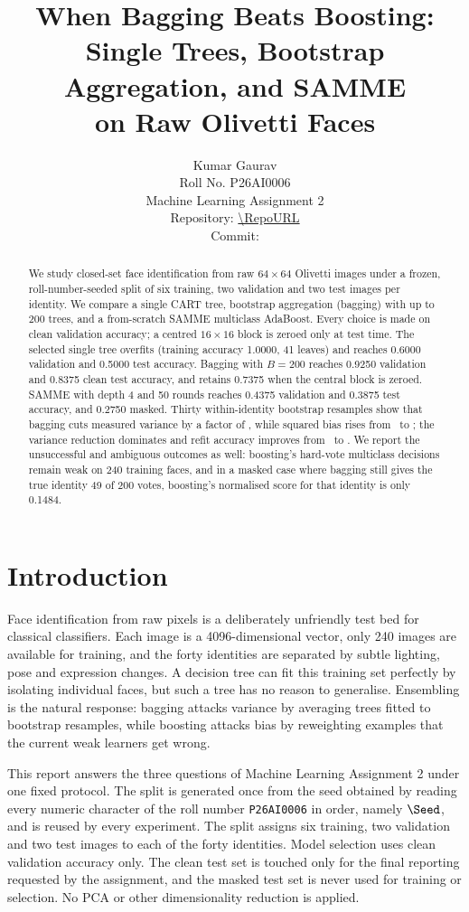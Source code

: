 \documentclass[10pt,twocolumn,letterpaper]{article}
\title{When Bagging Beats Boosting:\\
Single Trees, Bootstrap Aggregation, and SAMME\\ on Raw Olivetti Faces}
\author{Kumar Gaurav\\
Roll No. P26AI0006\\
Machine Learning Assignment 2\\
\small Repository: \url{\RepoURL}\\
\small Commit: \texttt{\CommitHash}}
\begin{document}
\maketitle

\begin{abstract}
We study closed-set face identification from raw $64\times64$ Olivetti images
under a frozen, roll-number-seeded split of six training, two validation and two
test images per identity.  We compare a single CART tree, bootstrap aggregation
(bagging) with up to 200 trees, and a from-scratch SAMME multiclass AdaBoost.
Every choice is made on clean validation accuracy; a centred $16\times16$ block
is zeroed only at test time.  The selected single tree overfits (training
accuracy 1.0000, 41 leaves) and reaches 0.6000 validation and 0.5000 test
accuracy.  Bagging with $B=200$ reaches 0.9250 validation and 0.8375 clean test
accuracy, and retains 0.7375 when the central block is zeroed.  SAMME with depth
4 and 50 rounds reaches 0.4375 validation and 0.3875 test accuracy, and 0.2750
masked.  Thirty within-identity bootstrap resamples show that bagging cuts measured
variance by a factor of \BagVarRatio, while squared bias rises from
\TreeFinalBias~to \BagFinalBias; the variance reduction dominates and refit
accuracy improves from \TreeRefitAcc~to \BagRefitAcc.  We report the unsuccessful
and ambiguous outcomes as well: boosting's hard-vote multiclass decisions remain
weak on 240 training faces, and in a masked case where bagging still gives the
true identity 49 of 200 votes, boosting's normalised score for that identity is
only 0.1484.
\end{abstract}

\section{Introduction}

Face identification from raw pixels is a deliberately unfriendly test bed for
classical classifiers.  Each image is a 4096-dimensional vector, only 240
images are available for training, and the forty identities are separated by
subtle lighting, pose and expression changes.  A decision tree can fit this
training set perfectly by isolating individual faces, but such a tree has no
reason to generalise.  Ensembling is the natural response: bagging attacks
variance by averaging trees fitted to bootstrap resamples, while boosting
attacks bias by reweighting examples that the current weak learners get wrong.

This report answers the three questions of Machine Learning Assignment 2 under
one fixed protocol.  The split is generated once from the seed obtained by
reading every numeric character of the roll number \texttt{P26AI0006} in order,
namely $\Seed$, and is reused by every experiment.  The split assigns six
training, two validation and two test images to each of the forty identities.
Model selection uses clean validation accuracy only.  The clean test set is
touched only for the final reporting requested by the assignment, and the masked
test set is never used for training or selection.  No PCA or other
dimensionality reduction is applied.
\end{document}
